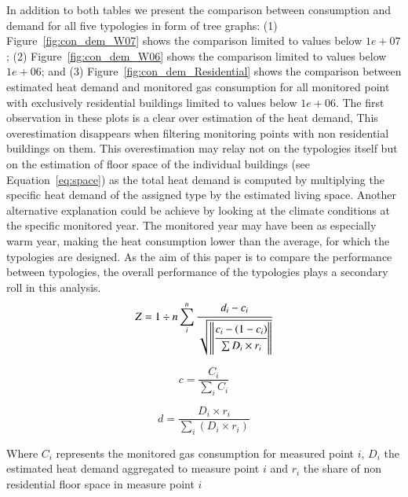 In addition to both tables we present the comparison between consumption and
demand for all five typologies in form of tree graphs: (1)
Figure~\ref{fig:con_dem_W07} shows the comparison limited to values below
$1e+07$; (2) Figure~\ref{fig:con_dem_W06} shows the comparison limited to
values below $1e+06$; and (3) Figure~\ref{fig:con_dem_Residential} shows the
comparison between estimated heat demand and monitored gas consumption for all
monitored point with exclusively residential buildings limited to values below
$1e+06$.  The first observation in these plots is a clear over estimation of
the heat demand, This overestimation disappears when filtering monitoring
points with non residential buildings on them. This overestimation may relay
not on the typologies itself but on the estimation of floor space of the
individual buildings (see Equation~\ref{eq:space}) as the total heat demand is
computed by multiplying the specific heat demand of the assigned type by the
estimated living space. Another alternative explanation could be achieve by
looking at the climate conditions at the specific monitored year. The monitored
year may have been as especially warm year, making the heat consumption lower
than the average, for which the typologies are designed. As the aim of this
paper is to compare the performance between typologies, the overall performance
of the typologies plays a secondary roll in this analysis.\\

\begin{equation}\label{eq:wsz}
  Z =1 \div n\sum_i^n \cfrac{d_i-c_i}{\sqrt{ \left \|
  	  \cfrac{c_i-\left(1-c_i\right)}{\sum{D_i \times r_i}}
  	  \right \|
  	  }}
\end{equation}

\begin{equation} \label{eq:wsz-p}
  c = \frac{C_i}{\sum_i{C_i}}
\end{equation} 

\begin{equation} \label{eq:wsz-E}
  d = \frac{D_{i} \times r_{i}}{\sum_i{\left(D_{i} \times r_{i}\right)
  }}
\end{equation}

Where
$C_i$ represents the monitored gas consumption for measured point $i$,
$D_i$ the estimated heat demand aggregated to measure point $i$ and
$r_i$ the share of non residential floor space in measure point $i$\\




